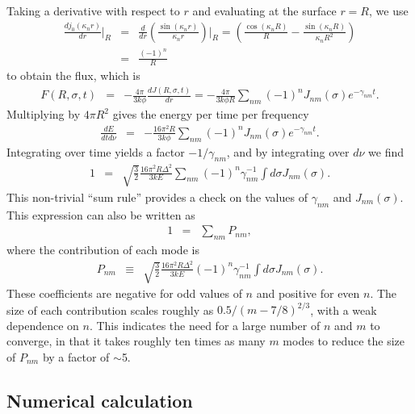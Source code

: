 \documentclass{aastex63}
\newcommand{\be}{\begin{eqnarray}}
\newcommand{\ee}{\end{eqnarray}}
\begin{document}
Taking a derivative with respect to $r$ and evaluating at the surface $r=R$, we use
\be
\frac{dj_0(\kappa_n r)}{dr} \bigg\rvert_R & =& \frac{d}{dr} \left( \frac{\sin(\kappa_n r)}{\kappa_n r} \right)\bigg\rvert_R
=  \left( \frac{\cos(\kappa_n R)}{R} - \frac{\sin(\kappa_n R)}{\kappa_n R^2} \right)
\nonumber \\ & = & \frac{(-1)^n}{R}
\ee
to obtain the flux, which is
\be
F(R,\sigma,t) & =& - \frac{4\pi}{3k\phi} \frac{dJ(R,\sigma,t)}{dr} 
= - \frac{4\pi}{3k\phi R}  \sum_{nm} (-1)^n J_{nm}(\sigma) e^{-\gamma_{nm}t}.
\ee
Multiplying by $4\pi R^2$ gives the energy per time per frequency
\be
\frac{dE}{dtd\nu} & = & - \frac{16\pi^2 R}{3k\phi}  \sum_{nm} (-1)^n J_{nm}(\sigma) e^{-\gamma_{nm}t}.
\label{eq:dEdtdnu}
\ee
Integrating over time yields a factor $-1/\gamma_{nm}$, and by integrating over $d\nu$ we find
\be \label{eq:sum_rule}
1 & = &  \sqrt{ \frac{3}{2} } \frac{16\pi^2R\Delta^2}{3kE} \sum_{nm} (-1)^n \gamma_{nm}^{-1} \int d\sigma J_{nm}(\sigma).
\ee
This non-trivial ``sum rule'' provides a check on the values of $\gamma_{nm}$ and $J_{nm}(\sigma)$. This expression can also be written as
\be
1 & =& \sum_{nm} P_{nm},
\label{eq:sumrule}
\ee
where the contribution of each mode is
\be \label{eq:pnmsoln}
P_{nm} & \equiv & \sqrt{ \frac{3}{2} } \frac{16\pi^2R\Delta^2}{3kE}  (-1)^n \gamma_{nm}^{-1} \int d\sigma J_{nm}(\sigma).
\ee
These coefficients are negative for odd values of $n$ and positive for even $n$. The size of each contribution scales roughly as $0.5/(m-7/8)^{2/3}$, with a weak dependence on $n$. This indicates the need for a large number of $n$ and $m$ to converge, in that it takes roughly ten times as many $m$ modes to reduce the size of $P_{nm}$ by a factor of ${\sim}$5. 

\subsection{Numerical calculation}
\end{document}
